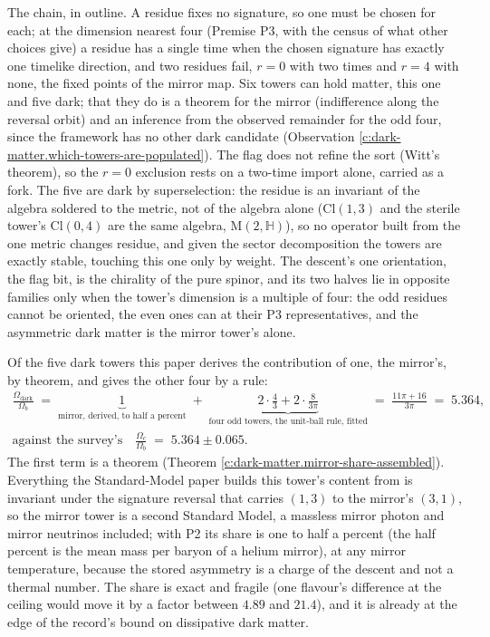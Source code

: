 \documentclass[11pt]{article}
\theoremstyle{definition}
\theoremstyle{plain}
\providecommand{\Cl}{}\renewcommand{\Cl}{\mathrm{Cl}}
\providecommand{\Mat}{}\renewcommand{\Mat}{\mathrm{M}}
\begin{document}
The chain, in outline. A residue fixes no signature, so one must be chosen for each; at the dimension nearest four (Premise P3, with the census of what other choices give) a residue has a single time when the chosen signature has exactly one timelike direction, and two residues fail, $r = 0$ with two times and $r = 4$ with none, the fixed points of the mirror map. Six towers can hold matter, this one and five dark; that they do is a theorem for the mirror (indifference along the reversal orbit) and an inference from the observed remainder for the odd four, since the framework has no other dark candidate (Observation \ref{c:dark-matter.which-towers-are-populated}). The flag does not refine the sort (Witt's theorem), so the $r = 0$ exclusion rests on a two-time import alone, carried as a fork. The five are dark by superselection: the residue is an invariant of the algebra soldered to the metric, not of the algebra alone ($\Cl(1,3)$ and the sterile tower's $\Cl(0,4)$ are the same algebra, $\Mat(2, \mathbb{H})$), so no operator built from the one metric changes residue, and given the sector decomposition the towers are exactly stable, touching this one only by weight. The descent's one orientation, the flag bit, is the chirality of the pure spinor, and its two halves lie in opposite families only when the tower's dimension is a multiple of four: the odd residues cannot be oriented, the even ones can at their P3 representatives, and the asymmetric dark matter is the mirror tower's alone.

Of the five dark towers this paper derives the contribution of one, the mirror's, by theorem, and gives the other four by a rule:
\begin{gather*}
\frac{\Omega_{\mathrm{dark}}}{\Omega_{b}} \;=\; \underbrace{1}_{\text{mirror, derived, to half a percent}} \;+\; \underbrace{2 \cdot \frac{4}{3} + 2 \cdot \frac{8}{3\pi}}_{\text{four odd towers, the unit-ball rule, fitted}} \;=\; \frac{11\pi + 16}{3\pi} \;=\; 5.364,\\[6pt]
\text{against the survey's}\quad
\frac{\Omega_{c}}{\Omega_{b}} \;=\; 5.364 \pm 0.065.
\end{gather*}
The first term is a theorem (Theorem \ref{c:dark-matter.mirror-share-assembled}). Everything the Standard-Model paper builds this tower's content from is invariant under the signature reversal that carries $(1,3)$ to the mirror's $(3,1)$, so the mirror tower is a second Standard Model, a massless mirror photon and mirror neutrinos included; with P2 its share is one to half a percent (the half percent is the mean mass per baryon of a helium mirror), at any mirror temperature, because the stored asymmetry is a charge of the descent and not a thermal number. The share is exact and fragile (one flavour's difference at the ceiling would move it by a factor between $4.89$ and $21.4$), and it is already at the edge of the record's bound on dissipative dark matter.
\end{document}
